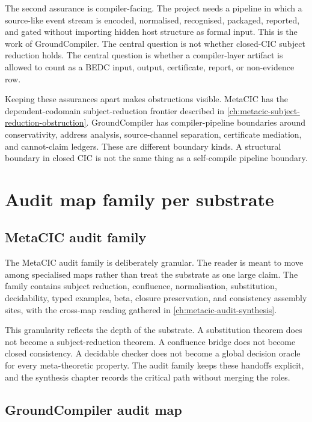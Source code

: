 The second assurance is compiler-facing. The project needs a pipeline in
which a source-like event stream is encoded, normalised, recognised, packaged,
reported, and gated without importing hidden host structure as formal input.
This is the work of GroundCompiler. The central question is not whether
closed-CIC subject reduction holds. The central question is whether a
compiler-layer artifact is allowed to count as a BEDC input, output,
certificate, report, or non-evidence row.

Keeping these assurances apart makes obstructions visible. MetaCIC has the
dependent-codomain subject-reduction frontier described in
\autoref{ch:metacic-subject-reduction-obstruction}. GroundCompiler has
compiler-pipeline boundaries around conservativity, address analysis,
source-channel separation, certificate mediation, and cannot-claim ledgers.
These are different boundary kinds. A structural boundary in closed CIC is
not the same thing as a self-compile pipeline boundary.

\section{Audit map family per substrate}
\label{sec:twin-substrate-synthesis-audit-families}

\subsection{MetaCIC audit family}
\label{subsec:twin-substrate-synthesis-metacic-family}

The MetaCIC audit family is deliberately granular. The reader is meant to
move among specialised maps rather than treat the substrate as one large
claim. The family contains subject reduction, confluence, normalisation,
substitution, decidability, typed examples, beta, closure preservation, and
consistency assembly sites, with the cross-map reading gathered in
\autoref{ch:metacic-audit-synthesis}.

This granularity reflects the depth of the substrate. A substitution theorem
does not become a subject-reduction theorem. A confluence bridge does not
become closed consistency. A decidable checker does not become a global
decision oracle for every meta-theoretic property. The audit family keeps
these handoffs explicit, and the synthesis chapter records the critical path
without merging the roles.

\subsection{GroundCompiler audit map}
\label{subsec:twin-substrate-synthesis-groundcompiler-family}

